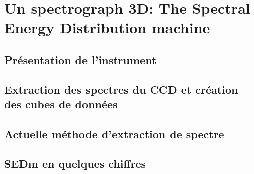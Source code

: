 \message{ !name(03_sedm.tex)}\documentclass[../main/main.tex]{subfiles}
\begin{document}



\chapter{Un spectrograph 3D: The Spectral Energy Distribution machine}\label{ch:sedm}

\minitoc
\newpage

\section{Présentation de l'instrument}
\citet{allingtonIFS}
\section{Extraction des spectres du CCD et création des cubes de données}

\section{Actuelle méthode d'extraction de spectre}

\section{SEDm en quelques chiffres}



\end{document}
